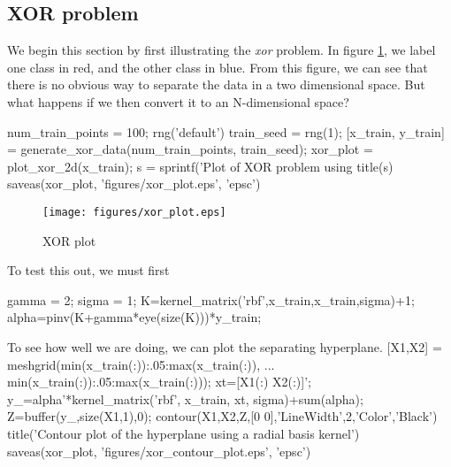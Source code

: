 \documentclass[11pt, twoside]{article}   	%
\newenvironment{matlab}{\comment}{\endcomment}
\begin{document}
\subsection{XOR problem}
We begin this section by first illustrating the \textit{xor} problem. In figure 
\ref{fig:xor_plot}, we label one class in red, and the other class in blue. From 
this figure, we can see that there is no obvious way to separate the data in a
two dimensional space. But what happens if we then convert it to an N-dimensional 
space? 

\begin{matlab}
num_train_points = 100; 
rng('default') 
train_seed = rng(1); 
[x_train, y_train] = generate_xor_data(num_train_points, train_seed);
xor_plot = plot_xor_2d(x_train); 
s = sprintf('Plot of XOR problem using %
title(s)
saveas(xor_plot, 'figures/xor_plot.eps', 'epsc')
\end{matlab}

\begin{figure}[h]
\centering
\texttt{[image: figures/xor\_plot.eps]}
\caption{XOR plot}
\label{fig:xor_plot} 
\end{figure}

\FloatBarrier
To test this out, we must first 

\begin{matlab}
gamma = 2; 
sigma = 1; 
K=kernel_matrix('rbf',x_train,x_train,sigma)+1; 
alpha=pinv(K+gamma*eye(size(K)))*y_train;
\end{matlab}

To see how well we are doing, we can plot the separating hyperplane. 
\begin{matlab}
[X1,X2] = meshgrid(min(x_train(:)):.05:max(x_train(:)), ...
   min(x_train(:)):.05:max(x_train(:)));     %
xt=[X1(:) X2(:)]';                        %
y_=alpha'*kernel_matrix('rbf', x_train, xt, sigma)+sum(alpha);    
Z=buffer(y_,size(X1,1),0);                %
contour(X1,X2,Z,[0 0],'LineWidth',2,'Color','Black')
title('Contour plot of the hyperplane using a radial basis kernel')
saveas(xor_plot, 'figures/xor_contour_plot.eps', 'epsc')



\end{matlab}
\end{document}
